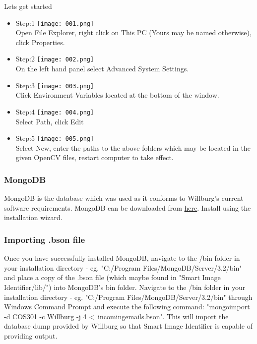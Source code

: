 \documentclass[a4paper,12pt]{report}
\begin{document}
	Lets get started
	
	\begin{itemize}
		\item Step:1	\linebreak
		\texttt{[image: 001.png]}\\
		\linebreak
		Open File Explorer, right click on This PC (Yours may be named otherwise), click Properties.
		\pagebreak
		\item Step:2	\linebreak
		\texttt{[image: 002.png]}\\ 
		\linebreak 
		On the left hand panel select Advanced System Settings.
		\item Step:3	\linebreak
		\texttt{[image: 003.png]}\\
		\linebreak
		Click Environment Variables located at the bottom of the window.	
		\pagebreak
		\item Step:4	\linebreak
		\texttt{[image: 004.png]}\\
		\linebreak
		Select Path, click Edit	
		\item Step:5	\linebreak
		\texttt{[image: 005.png]}\\
		\linebreak
		Select New, enter the paths to the above folders which may be located in the given
		OpenCV files, restart computer to take effect.
	\end{itemize}
	\pagebreak
	\subsubsection{MongoDB}
	MongoDB is the database which was used as it conforms to Willburg's current software requirements. \linebreak
	MongoDB can be downloaded from \href{https://www.mongodb.com/download-center#community}{here}.
	Install using the installation wizard. \linebreak
	
	\subsubsection{Importing .bson file}
	Once you have successfully installed MongoDB, navigate to the /bin folder in your installation directory - eg. "C:/Program Files/MongoDB/Server/3.2/bin" and place a copy of the .bson file (which maybe found in "Smart Image Identifier/lib/")  into MongoDB's bin folder.
	\linebreak\linebreak
	 Navigate to the /bin folder in your installation directory - eg. "C:/Program Files/MongoDB/Server/3.2/bin" through Windows Command Prompt and execute the following command: \linebreak
	 "mongoimport -d COS301 -c Willburg -j 4 \textless  \ incomingemails.bson". 
	 \linebreak This will import the database dump provided by Willburg so that Smart Image Identifier is capable of providing output.
		
\end{document}
